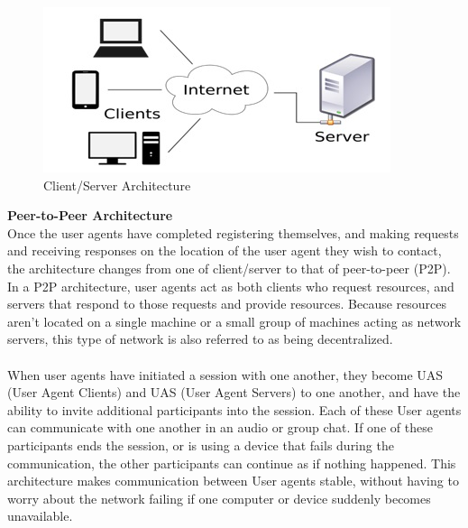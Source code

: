 \documentclass[a4paper]{article}
\begin{document}
\begin{center}
\begin{figure}[H]
\includegraphics[width=1\linewidth]{./pictures/ClientServer.JPG}
\caption{\label{fig:Client/Server Architecture} Client/Server Architecture}
\end{figure}
\end{center}

\textbf{Peer-to-Peer Architecture\\}
Once the user agents have completed registering themselves, and making requests and receiving responses on the location of the user agent they wish to contact, the architecture changes from one of client/server to that of peer-to-peer (P2P). In a P2P architecture, user agents act as both clients who request resources, and servers that respond to those requests and provide resources. Because resources aren’t located on a single machine or a small group of machines acting as network servers, this type of network is also referred to as being decentralized.\\
\\
When user agents have initiated a session with one another, they become UAS (User Agent Clients) and UAS (User Agent Servers) to one another, and have the ability to invite additional participants into the session. Each of these User agents can communicate with one another in an audio or group chat. If one of these participants ends the session, or is using a device that fails during the communication, the other participants can continue as if nothing happened. This architecture makes communication between User agents stable, without having to worry about the network failing if one computer or device suddenly becomes unavailable.
\end{document}
